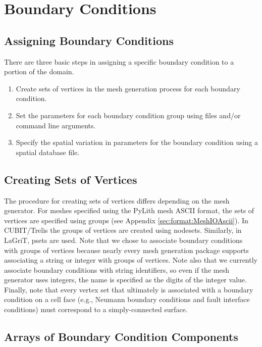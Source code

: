 \section{Boundary Conditions}
\label{src:boundary:conditions}

\subsection{Assigning Boundary Conditions}

There are three basic steps in assigning a specific boundary condition
to a portion of the domain.
\begin{enumerate}
\item Create sets of vertices in the mesh generation process for each boundary
  condition.
\item Set the parameters for each boundary condition group using
   files and/or command line
  arguments.
\item Specify the spatial variation in parameters for the boundary
  condition using a spatial database file.
\end{enumerate}

\subsection{Creating Sets of Vertices}

The procedure for creating sets of vertices differs depending on the
mesh generator. For meshes specified using the PyLith mesh ASCII
format, the sets of vertices are specified using groups (see Appendix
\vref{sec:format:MeshIOAscii}).  In CUBIT/Trelis the groups of
vertices are created using nodesets. Similarly, in LaGriT, psets are
used. Note that we chose to associate boundary conditions with groups
of vertices because nearly every mesh generation package supports
associating a string or integer with groups of vertices.  Note also
that we currently associate boundary conditions with string
identifiers, so even if the mesh generator uses integers, the name is
specified as the digits of the integer value. Finally, note that every
vertex set that ultimately is associated with a boundary condition on
a cell face (e.g., Neumann boundary conditions and fault interface
conditions) must correspond to a simply-connected surface.

\subsection{Arrays of Boundary Condition Components}

